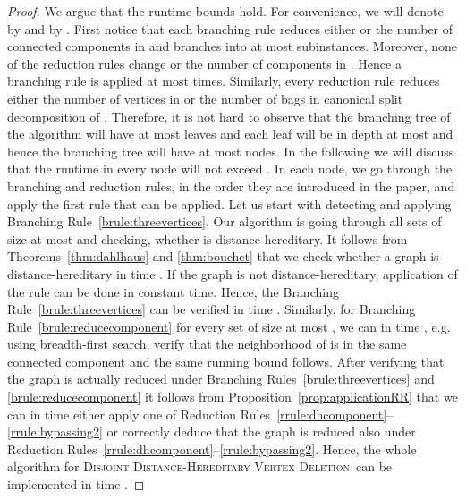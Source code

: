 \documentclass[11pt]{elsarticle}
\newcommand{\disjointDHVD}{\textsc{Disjoint Distance-Hereditary Vertex Deletion}}
\begin{document}
\begin{proof}
We argue that the runtime bounds hold. For convenience, we will denote  by  and  by .
First notice that each branching rule reduces either  or the number of connected components in  and branches into at most  subinstances. Moreover, none of the reduction rules change  or the number of components in . Hence a branching rule is applied at most  times. Similarly, every reduction rule reduces either the number of vertices in  or the number of bags in canonical split decomposition of . Therefore, it is not hard to observe that the branching tree of the algorithm will have at most  leaves and each leaf will be in depth at most  and hence the branching tree will have at most  nodes. In the following we will discuss that the runtime in every node will not exceed . In each node, we go through the branching and reduction rules, in the order they are introduced in the paper, and apply the first rule that can be applied. 
Let us start with detecting and applying  Branching Rule~\ref{brule:threevertices}.  
Our algorithm is going through all sets  of size at most  and checking, whether  is distance-hereditary. It follows from Theorems~\ref{thm:dahlhaus} and \ref{thm:bouchet} that we check whether a graph is distance-hereditary in time . If the graph is not distance-hereditary, application of the rule can be done in constant time. Hence, the Branching Rule~\ref{brule:threevertices} can be verified in time  . Similarly, for Branching Rule~\ref{brule:reducecomponent} for every set  of size at most , we can in time , e.g. using breadth-first search, verify that the neighborhood of  is in the same connected component and the same running bound follows.  
After verifying that the graph is actually reduced under Branching Rules~\ref{brule:threevertices} and \ref{brule:reducecomponent} it follows from Proposition~\ref{prop:applicationRR} that we can in time  either apply one of Reduction Rules~\ref{rrule:dhcomponent}--\ref{rrule:bypassing2} or correctly deduce that the graph is reduced also under Reduction Rules~\ref{rrule:dhcomponent}--\ref{rrule:bypassing2}. Hence, the whole algorithm for \disjointDHVD\ can be implemented in time .
\end{proof}
\end{document}
